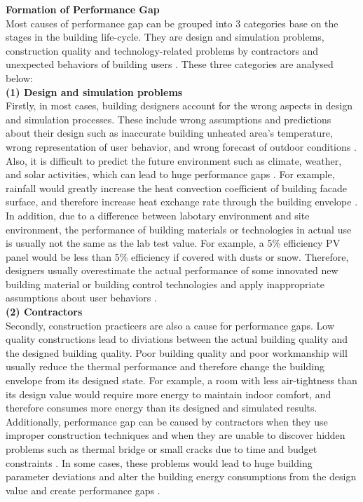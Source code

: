 \documentclass[a4paper, oneside]{discothesis}
\begin{document}
	\textbf{Formation of Performance Gap}\\
		Most causes of performance gap can be grouped into 3 categories base on the stages in the building life-cycle. They are design and simulation problems, construction quality and technology-related problems by contractors and unexpected behaviors of building users \cite{userevaluations,NIU2016275}. These three categories are analysed below:\\
		
		\textbf{(1) Design and simulation problems}\\
		Firstly, in most cases, building designers account for the wrong aspects in design and simulation processes. These include wrong assumptions and predictions about their design such as inaccurate building unheated area's temperature, wrong representation of user behavior, and wrong forecast of outdoor conditions \cite{NIU2016275,HOFFMANN201731}. Also, it is difficult to predict the future environment such as climate, weather, and solar activities, which can lead to huge performance gaps \cite{DIAZ2017393,doi:10.1080/19401493.2012.718797}. For example, rainfall would greatly increase the heat convection coefficient of building facade surface, and therefore increase heat exchange rate through the building envelope \cite{DIAZ2017393}. In addition, due to a difference between labotary environment and site environment, the performance of building materials or technologies in actual use is usually not the same as the lab test value. For example, a 5\% efficiency PV panel would be less than 5\% efficiency if covered with dusts or snow. Therefore, designers usually overestimate the actual performance of some innovated new building material or building control technologies and apply inappropriate assumptions about user behaviors \cite{DEWILDE201440}. \\

		\textbf{(2) Contractors}\\
		Secondly, construction practicers are also a cause for performance gaps. Low quality constructions lead to diviations between the actual building quality and the designed building quality. Poor building quality and poor workmanship will usually reduce the thermal performance and therefore change the building envelope from its designed state. For example, a room with less air-tightness than its design value would require more energy to maintain indoor comfort, and therefore consumes more energy than its designed and simulated results. Additionally, performance gap can be caused by contractors when they use improper construction techniques and when they are unable to discover hidden problems such as thermal bridge or small cracks due to time and budget constraints \cite{DEWILDE201440}. In some cases, these problems would lead to huge building parameter deviations and alter the building energy consumptions from the design value and create performance gaps \cite{FREI2017421,DEWILDE201440}.\\ 
\end{document}
